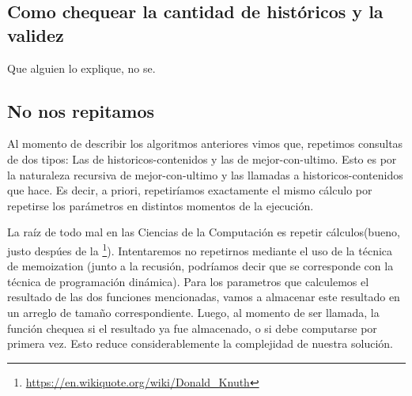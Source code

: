 \subsection{Como chequear la cantidad de históricos y la validez}
Que alguien lo explique, no se.

\subsection{No nos repitamos}
\par{Al momento de describir los algoritmos anteriores vimos que, repetimos consultas de dos tipos:
Las de historicos-contenidos y las de mejor-con-ultimo. Esto es por la naturaleza recursiva de mejor-con-ultimo y las llamadas a historicos-contenidos que hace. Es decir, a priori, repetiríamos exactamente el mismo cálculo por repetirse los parámetros en distintos momentos de la ejecución.}
\par{La raíz de todo mal en las Ciencias de la Computación es repetir cálculos(bueno, justo despúes de la \footnote{\url{https://en.wikiquote.org/wiki/Donald_Knuth}}). Intentaremos no repetirnos mediante el uso de la técnica de memoization (junto a la recusión, podríamos decir que se corresponde con la técnica de programación dinámica). Para los parametros que calculemos el resultado de las dos funciones mencionadas, vamos a almacenar este resultado en un arreglo de tamaño correspondiente. Luego, al momento de ser llamada, la función chequea si el resultado ya fue almacenado, o si debe computarse por primera vez. Esto reduce considerablemente la complejidad de nuestra solución. }


